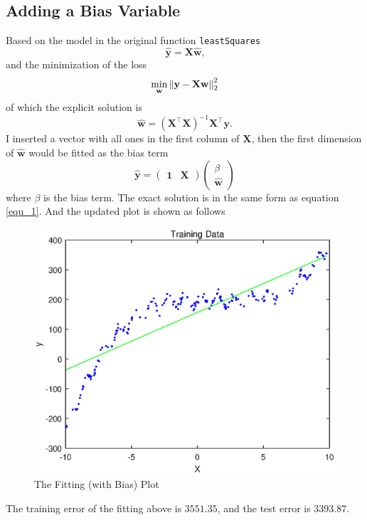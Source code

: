 \documentclass[10pt]{article}
\begin{document}
\subsection{Adding a Bias Variable}
Based on the model in the original function \texttt{leastSquares}
$$\hat{\mathbf{y}} = \mathbf{X}\hat{\mathbf{w}}\text{,}$$
and the minimization of the loss
$$\min_{\mathbf{w}}\norm{\mathbf{y} - \mathbf{X}\mathbf{w}}_2^2$$
of which the explicit solution \cite{shumway2010time} is
\begin{equation}
\hat{\mathbf{w}} = \left(\mathbf{X}^\intercal\mathbf{X}\right)^{-1}\mathbf{X}^\intercal\mathbf{y}\text{.}
\label{equ_1}
\end{equation}
I inserted a vector with all ones in the first column of $\mathbf{X}$, then the first dimension of $\hat{\mathbf{w}}$ would be fitted as the bias term
$$\hat{\mathbf{y}} = \begin{pmatrix}
\mathbf{1} & \mathbf{X}
\end{pmatrix}\begin{pmatrix}
\beta \\
\hat{\mathbf{w}}
\end{pmatrix}$$
where $\beta$ is the bias term. The exact solution is in the same form as equation \ref{equ_1}. And the updated plot is shown as follows
\begin{figure}[H]
\centering
\includegraphics[scale=.65]{plot1_1.eps}
\caption{The Fitting (with Bias) Plot}
\label{plot1_1}
\end{figure}
The training error of the fitting above is $3551.35$, and the test error is $3393.87$.\par
\end{document}
